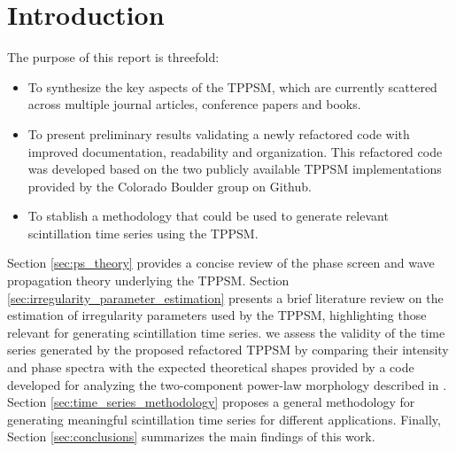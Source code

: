 \section{Introduction} 
\label{sec:introduction}
The purpose of this report is threefold:
\begin{itemize}
    \item To synthesize the key aspects of the TPPSM, which are currently scattered across  multiple journal articles, conference papers and books.
    \item To present preliminary results validating a newly refactored code with improved documentation, readability and organization. This refactored code was developed based on the two publicly available TPPSM implementations provided by the Colorado Boulder group on Github.
    \item To stablish a methodology that could be used to generate relevant scintillation time series using the TPPSM.
\end{itemize}
Section \ref{sec:ps_theory} provides a concise review of the phase screen and wave propagation theory underlying the TPPSM.  Section \ref{sec:irregularity_parameter_estimation} presents a brief literature review on the estimation of irregularity parameters used by the TPPSM, highlighting those relevant for generating scintillation time series.  we assess the validity of the time series generated by the proposed refactored TPPSM by comparing their intensity and phase spectra with the expected theoretical shapes provided by a code developed for analyzing the two-component power-law morphology described in \cite{Carrano2016OverviewOfTwoComponentPowerLaw}. Section \ref{sec:time_series_methodology} proposes a general methodology for generating meaningful scintillation time series for different applications. Finally, Section \ref{sec:conclusions} summarizes the main findings of this work.